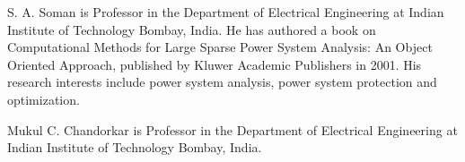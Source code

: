 \documentclass[journal]{IEEEtran}
\begin{document}
\begin{IEEEbiographynophoto}{S. A. Soman}
is Professor in the  Department of  Electrical
Engineering at  Indian Institute of Technology Bombay, India.
He has authored a book on Computational Methods for Large Sparse Power System Analysis: An Object Oriented Approach,
published by Kluwer Academic Publishers in 2001. His research interests include power system analysis, power system protection and optimization.
\end{IEEEbiographynophoto}

\begin{IEEEbiographynophoto}{Mukul C. Chandorkar}
is Professor in the  Department of  Electrical
Engineering at  Indian Institute of Technology Bombay, India.
\end{IEEEbiographynophoto}
\end{document}
